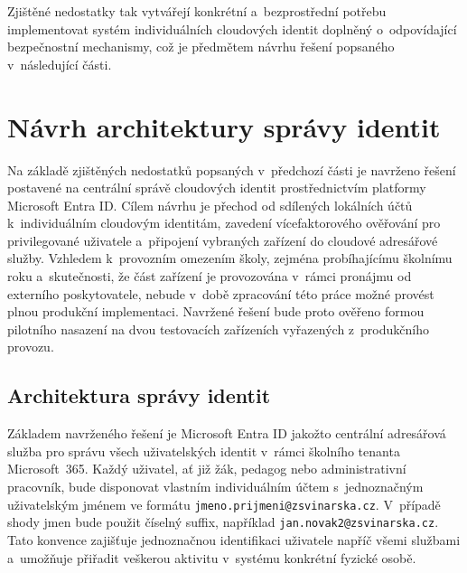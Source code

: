 \documentclass[male,czech,api_bc]{kitheses}
\begin{document}
Zjištěné nedostatky tak vytvářejí konkrétní a~bezprostřední potřebu 
implementovat systém individuálních cloudových identit doplněný o~odpovídající 
bezpečnostní mechanismy, což je předmětem návrhu řešení popsaného 
v~následující části.

\section{Návrh architektury správy identit}

Na základě zjištěných nedostatků popsaných v~předchozí části je navrženo řešení 
postavené na centrální správě cloudových identit prostřednictvím platformy 
Microsoft Entra ID. Cílem návrhu je přechod od sdílených lokálních účtů 
k~individuálním cloudovým identitám, zavedení vícefaktorového ověřování pro 
privilegované uživatele a~připojení vybraných zařízení do cloudové adresářové 
služby. Vzhledem k~provozním omezením školy, zejména probíhajícímu školnímu 
roku a~skutečnosti, že část zařízení je provozována v~rámci pronájmu od 
externího poskytovatele, nebude v~době zpracování této práce možné provést 
plnou produkční implementaci. Navržené řešení bude proto ověřeno formou 
pilotního nasazení na dvou testovacích zařízeních vyřazených z~produkčního 
provozu.

\subsection{Architektura správy identit}

Základem navrženého řešení je Microsoft Entra ID jakožto centrální adresářová 
služba pro správu všech uživatelských identit v~rámci školního tenanta 
Microsoft~365. Každý uživatel, ať již žák, pedagog nebo administrativní 
pracovník, bude disponovat vlastním individuálním účtem s~jednoznačným 
uživatelským jménem ve formátu \texttt{jmeno.prijmeni@zsvinarska.cz}. 
V~případě shody jmen bude použit číselný suffix, například 
\texttt{jan.novak2@zsvinarska.cz}. Tato konvence zajišťuje jednoznačnou 
identifikaci uživatele napříč všemi službami a~umožňuje přiřadit veškerou 
aktivitu v~systému konkrétní fyzické osobě.
\end{document}
